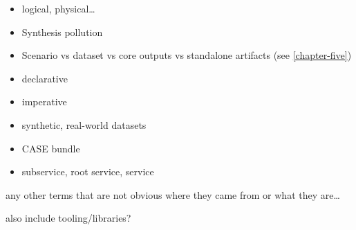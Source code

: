 \begin{itemize}
\item
  logical, physical\ldots{}
\item
  Synthesis pollution
\item
  Scenario vs dataset vs core outputs vs standalone artifacts (see
  \autoref{chapter-five})
\item
  declarative
\item
  imperative
\item
  synthetic, real-world datasets
\item
  CASE bundle
\item
  subservice, root service, service
\end{itemize}

any other terms that are not obvious where they came from or what they
are\ldots{}

also include tooling/libraries?
